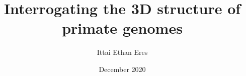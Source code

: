 \documentclass{ucetd}
\title{Interrogating the 3D structure of primate genomes}
\author{Ittai Ethan Eres}
\date{December 2020}
\begin{document}
\maketitle

\makecopyright


\tableofcontents
\listoffigures
\listoftables





\mainmatter










\makebibliography

%
%
\end{document}
